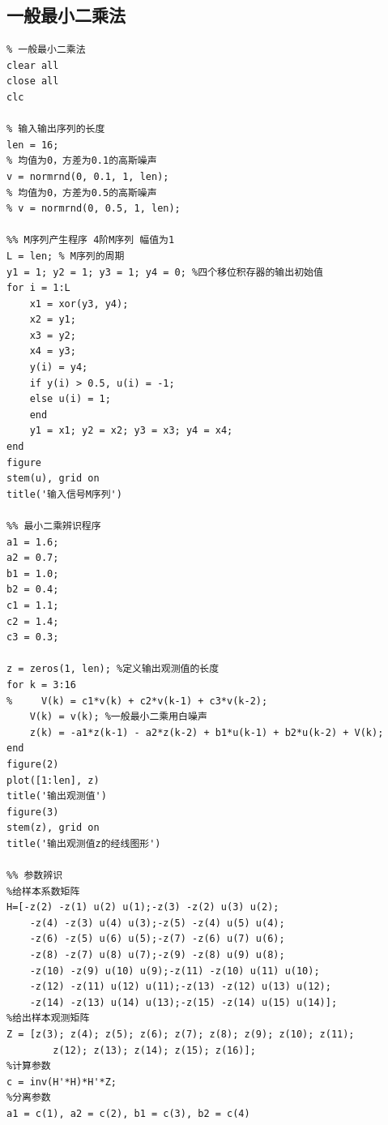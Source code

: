 \documentclass[UTF8]{article}
\begin{document}
\subsection{一般最小二乘法}
\begin{lstlisting}
% 一般最小二乘法
clear all
close all
clc

% 输入输出序列的长度
len = 16;
% 均值为0，方差为0.1的高斯噪声
v = normrnd(0, 0.1, 1, len);
% 均值为0，方差为0.5的高斯噪声
% v = normrnd(0, 0.5, 1, len);

%% M序列产生程序 4阶M序列 幅值为1
L = len; % M序列的周期
y1 = 1; y2 = 1; y3 = 1; y4 = 0; %四个移位积存器的输出初始值
for i = 1:L
    x1 = xor(y3, y4);
    x2 = y1;
    x3 = y2;
    x4 = y3;
    y(i) = y4;
    if y(i) > 0.5, u(i) = -1;
    else u(i) = 1;
    end
    y1 = x1; y2 = x2; y3 = x3; y4 = x4;
end
figure
stem(u), grid on
title('输入信号M序列')

%% 最小二乘辨识程序 
a1 = 1.6;
a2 = 0.7;
b1 = 1.0;
b2 = 0.4; 
c1 = 1.1;
c2 = 1.4;
c3 = 0.3;

z = zeros(1, len); %定义输出观测值的长度
for k = 3:16 
%     V(k) = c1*v(k) + c2*v(k-1) + c3*v(k-2);
    V(k) = v(k); %一般最小二乘用白噪声
    z(k) = -a1*z(k-1) - a2*z(k-2) + b1*u(k-1) + b2*u(k-2) + V(k);
end
figure(2)
plot([1:len], z)
title('输出观测值')
figure(3)
stem(z), grid on
title('输出观测值z的经线图形')

%% 参数辨识
%给样本系数矩阵
H=[-z(2) -z(1) u(2) u(1);-z(3) -z(2) u(3) u(2);
    -z(4) -z(3) u(4) u(3);-z(5) -z(4) u(5) u(4);
    -z(6) -z(5) u(6) u(5);-z(7) -z(6) u(7) u(6);
    -z(8) -z(7) u(8) u(7);-z(9) -z(8) u(9) u(8);
    -z(10) -z(9) u(10) u(9);-z(11) -z(10) u(11) u(10);
    -z(12) -z(11) u(12) u(11);-z(13) -z(12) u(13) u(12);
    -z(14) -z(13) u(14) u(13);-z(15) -z(14) u(15) u(14)];
%给出样本观测矩阵
Z = [z(3); z(4); z(5); z(6); z(7); z(8); z(9); z(10); z(11); 
        z(12); z(13); z(14); z(15); z(16)];
%计算参数
c = inv(H'*H)*H'*Z;
%分离参数
a1 = c(1), a2 = c(2), b1 = c(3), b2 = c(4)    
\end{lstlisting}
\end{document}
